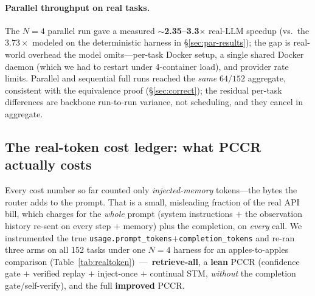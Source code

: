 \documentclass[10pt,twocolumn]{article}
\begin{document}
\paragraph{Parallel throughput on real tasks.} The $N{=}4$ parallel run gave a measured
\textbf{$\sim$2.35--3.3$\times$} real-LLM speedup (vs.\ the $3.73\times$ modeled on the deterministic
harness in \S\ref{sec:par-results}); the gap is real-world overhead the model omits---per-task Docker
setup, a single shared Docker daemon (which we had to restart under 4-container load), and provider
rate limits. Parallel and sequential full runs reached the \emph{same} $64/152$ aggregate, consistent
with the equivalence proof (\S\ref{sec:correct}); the residual per-task differences are backbone
run-to-run variance, not scheduling, and they cancel in aggregate.

\subsection{The real-token cost ledger: what PCCR actually costs}\label{sec:realtoken}
Every cost number so far counted only \emph{injected-memory} tokens---the bytes the router adds to
the prompt. That is a small, misleading fraction of the real API bill, which charges for the
\emph{whole} prompt (system instructions $+$ the observation history re-sent on every step $+$ memory)
plus the completion, on \emph{every} call. We instrumented the true
\texttt{usage.prompt\_tokens}$+$\texttt{completion\_tokens} and re-ran three arms on all 152 tasks
under one $N{=}4$ harness for an apples-to-apples comparison
(Table~\ref{tab:realtoken})~---~\textbf{retrieve-all}, a \textbf{lean} PCCR (confidence gate $+$
verified replay $+$ inject-once $+$ continual STM, \emph{without} the completion gate/self-verify),
and the full \textbf{improved} PCCR.
\end{document}

